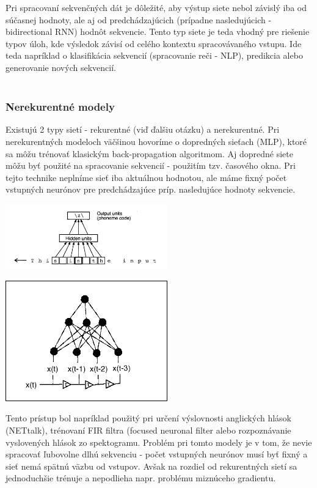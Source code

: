 \documentclass{article}
\numberwithin{equation}{section} %
\begin{document}
Pri spracovaní sekvenčných dát je dôležité, aby výstup siete nebol závislý iba od súčasnej hodnoty, ale aj od predchádzajúcich (prípadne nasledujúcich - bidirectional RNN) hodnôt sekvencie. Tento typ siete je teda vhodný pre riešenie typov úloh, kde výsledok závisí od celého kontextu spracovávaného vstupu. Ide teda napríklad o klasifikácia sekvencií (spracovanie reči - NLP), predikcia alebo generovanie nových sekvencií.
\\\\
\subsubsection{Nerekurentné modely}
Existujú 2 typy sietí - rekurentné (viď ďalšiu otázku) a nerekurentné. Pri nerekurentných modeloch väčšinou hovoríme o dopredných sieťach (MLP), ktoré sa môžu trénovať klasickým back-propagation algoritmom. Aj dopredné siete môžu byť použité na spracovanie sekvencií - použitím tzv. časového okna. Pri tejto technike neplníme sieť iba aktuálnou hodnotou, ale máme fixný počet vstupných neurónov pre predchádzajúce príp. nasledujúce hodnoty sekvencie.
\begin{center}
\includegraphics[width=7cm]{imgs/tap}\\
\end{center}
\begin{center}
\includegraphics[width=7cm]{imgs/tapped}\\
\end{center}
Tento prístup bol napríklad použitý pri určení výslovnosti anglických hlások (NETtalk), trénovaní FIR filtra (focused neuronal filter alebo rozpoznávanie vyslovených hlások zo spektogramu. Problém pri tomto modely je v tom, že nevie spracovať ľubovolne dlhú sekvenciu - počet vstupných neurónov musí byť fixný a sieť nemá spätnú väzbu od vstupov. Avšak na rozdiel od rekurentných sietí sa jednoduchšie trénuje a nepodlieha napr. problému miznúceho gradientu. 
\end{document}
